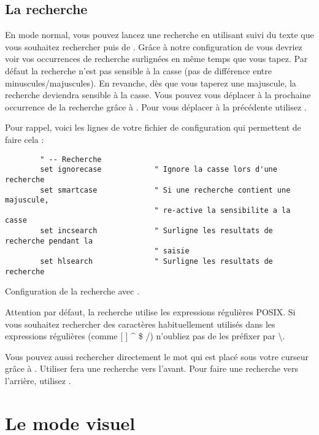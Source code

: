 \subsection{La recherche}

En mode normal, vous pouvez lancez une recherche en utilisant \ttslash suivi du texte que vous souhaitez rechercher puis de \ttenter. Grâce à notre configuration de \vim vous devriez voir vos occurrences de recherche surlignées en même temps que vous tapez. Par défaut la recherche n'est pas sensible à la casse (pas de différence entre minuscules/majuscules). En revanche, dès que vous taperez une majuscule, la recherche deviendra sensible à la casse. Vous pouvez vous déplacer à la prochaine occurrence de la recherche grâce à \ttn. Pour vous déplacer à la précédente utilisez \ttN.

Pour rappel, voici les lignes de votre fichier de configuration qui permettent de faire cela :

\begin{listing}[H]

    \begin{verbatim}
        " -- Recherche
        set ignorecase            " Ignore la casse lors d'une recherche
        set smartcase             " Si une recherche contient une majuscule,
                                  " re-active la sensibilite a la casse
        set incsearch             " Surligne les resultats de recherche pendant la
                                  " saisie
        set hlsearch              " Surligne les resultats de recherche
    \end{verbatim}
    \caption{Configuration de la recherche avec \vim.}
    \label{code:search-config}
\end{listing}

Attention par défaut, la recherche utilise les expressions régulières POSIX. Si vous souhaitez rechercher des caractères habituellement utilisés dans les expressions régulières (comme [ ] \^{ } \$ /) n'oubliez pas de les préfixer par \textbackslash.

Vous pouvez aussi rechercher directement le mot qui est placé sous votre curseur grâce à \ttstar. Utiliser \ttstar fera une recherche vers l'avant. Pour faire une recherche vers l'arrière, utilisez \ttsharp.

\section{Le mode visuel}

